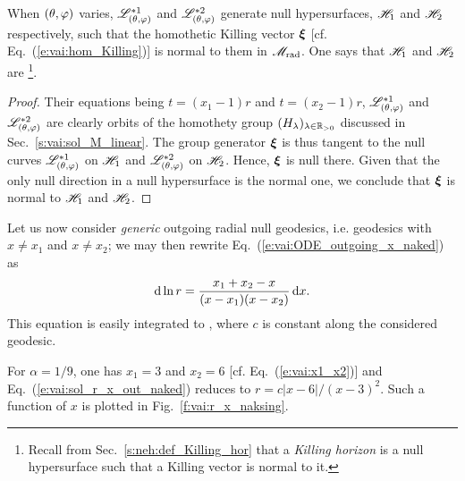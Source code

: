 \begin{prop}
When $(\theta,\varphi)$ varies, $\mathscr{L}^{*1}_{(\theta,\varphi)}$ and $\mathscr{L}^{*2}_{(\theta,\varphi)}$
generate null hypersurfaces, $\mathscr{H}_1$ and $\mathscr{H}_2$ respectively,
such that the homothetic Killing vector $\bm{\xi}$
[cf. Eq.~(\ref{e:vai:hom_Killing})] is normal to them
in $\mathscr{M}_{\rm rad}$. One says that $\mathscr{H}_1$ and $\mathscr{H}_2$
are
\footnote{Recall from Sec.~\ref{s:neh:def_Killing_hor} that
a \emph{Killing horizon} is a null hypersurface such that a Killing vector is normal to it.}.
\end{prop}
\begin{proof}
Their equations being $t=(x_1 - 1)r$ and $t=(x_2 - 1)r$, $ \mathscr{L}^{*1}_{(\theta,\varphi)}$ and
$ \mathscr{L}^{*2}_{(\theta,\varphi)}$ are clearly orbits of the
homothety group $(H_\lambda)_{\lambda\in \mathbb{R}_{>0}}$ discussed in Sec.~\ref{s:vai:sol_M_linear}.
The group generator $\bm{\xi}$ is thus tangent to the null curves $\mathscr{L}^{*1}_{(\theta,\varphi)}$ on $\mathscr{H}_1$
and $\mathscr{L}^{*2}_{(\theta,\varphi)}$ on $\mathscr{H}_2$. Hence,
$\bm{\xi}$ is null there. Given that the
only null direction in a null hypersurface is the normal one, we conclude
that  $\bm{\xi}$ is normal to $\mathscr{H}_1$ and $\mathscr{H}_2$.
\end{proof}


Let us now consider \emph{generic} outgoing radial null geodesics, i.e.
geodesics with
$x\neq x_1$ and $x \neq x_2$; we may then rewrite Eq.~(\ref{e:vai:ODE_outgoing_x_naked}) as
\[
    \mathrm{d} \ln r = \frac{x_1 + x_2 - x}{(x - x_1)(x - x_2)} \, \mathrm{d} x .
\]
This equation is easily integrated to
\be \label{e:vai:sol_r_x_out_naked}
   ,
\ee
where $c$ is constant along the considered geodesic.

\begin{example} \label{x:vai:sol_out_1o9}
For $\alpha=1/9$, one has $x_1 = 3$ and $x_2 = 6$ [cf. Eq.~(\ref{e:vai:x1_x2})]
and Eq.~(\ref{e:vai:sol_r_x_out_naked}) reduces to
$r = c |x - 6|/(x - 3)^2$. Such a function of $x$ is
plotted in Fig.~\ref{f:vai:r_x_naksing}.
\end{example}

